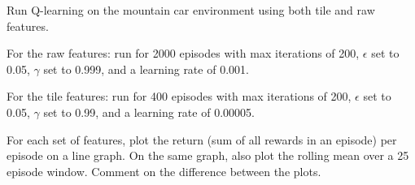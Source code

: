 \documentclass[11pt,addpoints,answers]{exam}
\begin{document}
\begin{questions}
    \question[4] Run Q-learning on the mountain car environment using both tile and raw features. 
    
    For the raw features: run for 2000 episodes with max iterations of 200, $\epsilon$ set to 0.05, $\gamma$ set to 0.999, and a learning rate of 0.001. 
    
    For the tile features: run for 400 episodes with max iterations of 200, $\epsilon$ set to 0.05, $\gamma$ set to 0.99, and a learning rate of 0.00005.
    
    For each set of features, plot the return (sum of all rewards in an episode) per episode on a line graph. On the same graph, also plot the rolling mean over a 25 episode window. Comment on the difference between the plots.
    
    \begin{your_solution}[title=Plot of Raw, height=10cm,width=15cm]
    \end{your_solution}
    
    \begin{your_solution}[title=Plot of Tile,height=10cm,width=15cm]
    \end{your_solution}
    

\end{questions}
\end{document}
